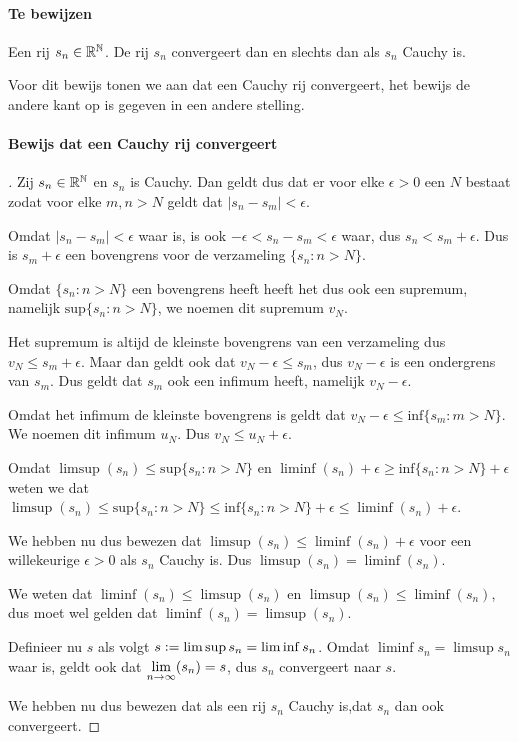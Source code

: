 \label{sec:AB}

\paragraph{Te bewijzen} Een rij $s_{n}\in\mathbb{R}^{\mathbb{N}}$. De rij $s_{n}$ convergeert dan en slechts dan als $s_{n}$ Cauchy is. \bigskip

\noindent Voor dit bewijs tonen we aan dat een Cauchy rij convergeert, het bewijs de andere kant op is gegeven in een andere stelling.

\paragraph{Bewijs dat een Cauchy rij convergeert}

\begin{proof}[\unskip\nopunct]

Zij $s_{n}\in\mathbb{R}^{\mathbb{N}}$ en $s_{n}$ is Cauchy. Dan geldt dus dat er voor elke $\epsilon>0$ een $N$ bestaat zodat voor elke $m,n>N$ geldt dat $|s_{n}-s_{m}|<\epsilon$. \bigskip

\noindent Omdat $|s_{n}-s_{m}|<\epsilon$ waar is, is ook $-\epsilon<s_{n}-s_{m}<\epsilon$ waar, dus $s_{n}<s_{m}+\epsilon$. Dus is $s_{m}+\epsilon$ een bovengrens voor de verzameling $\{s_{n}:n>N\}$. \bigskip

\noindent Omdat $\{s_{n}:n>N\}$ een bovengrens heeft heeft het dus ook een supremum, namelijk $\text{sup}\{s_{n}:n>N\}$, we noemen dit supremum $v_{N}$. \bigskip

\noindent Het supremum is altijd de kleinste bovengrens van een verzameling dus $v_{N} \leq s_{m}+\epsilon$. Maar dan geldt ook dat $v_{N} - \epsilon \leq s_{m}$, dus $v_{N} - \epsilon$ is een ondergrens van $s_{m}$. Dus geldt dat $s_{m}$ ook een infimum heeft, namelijk $v_{N}-\epsilon$. \bigskip

\noindent Omdat het infimum de kleinste bovengrens is geldt dat $v_{N}-\epsilon\leq\text{inf}\{s_{m}:m>N\}$. We noemen dit infimum $u_{N}$. Dus $v_{N} \leq u_{N}+\epsilon$. \bigskip

\noindent Omdat $\limsup(s_{n})\leq\text{sup}\{s_{n}:n>N\}$ en $\liminf(s_{n})+\epsilon\geq\text{inf}\{s_{n}:n>N\}+\epsilon$ weten we dat $\limsup(s_{n})\leq\text{sup}\{s_{n}:n>N\}\leq\text{inf}\{s_{n}:n>N\}+\epsilon\leq\liminf(s_{n})+\epsilon$. \bigskip

\noindent We hebben nu dus bewezen dat $\limsup(s_{n})\leq\liminf(s_{n})+\epsilon$ voor een willekeurige $\epsilon>0$ als $s_{n}$ Cauchy is. Dus $\limsup(s_{n})=\liminf(s_{n})$. \bigskip

\noindent We weten dat $\liminf(s_{n})\leq\limsup(s_{n})$ en $\limsup(s_{n})\leq\liminf(s_{n})$, dus moet wel gelden dat $\liminf(s_{n})=\limsup(s_{n})$. \bigskip

\noindent Definieer nu $s$ als volgt $s\vcentcolon=\limsup{s_{n}}=\liminf{s_{n}}$. Omdat $\liminf{s_{n}}=\limsup{s_{n}}$ waar is, geldt ook dat $\underset{n\to\infty}{\text{lim}}(s_{n})=s$, dus $s_{n}$ convergeert naar $s$. \bigskip

\noindent We hebben nu dus bewezen dat als een rij $s_{n}$ Cauchy is,dat $s_{n}$ dan ook convergeert.

\end{proof}